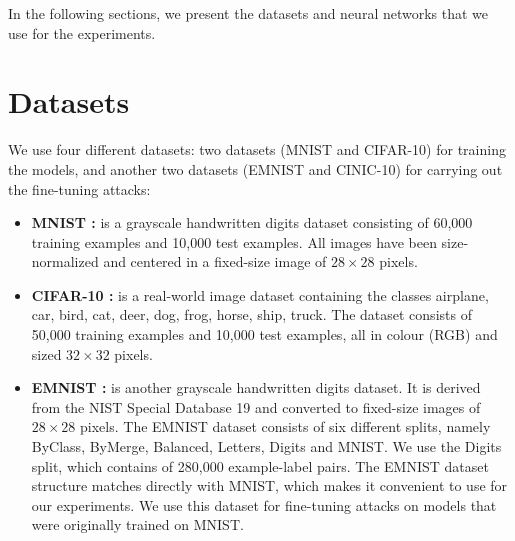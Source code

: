 
In the following sections, we present the datasets and neural networks that we use for the experiments.

\section{Datasets}
We use four different datasets: two datasets (MNIST and CIFAR-10) for training the models, and another two datasets (EMNIST and CINIC-10) for carrying out the fine-tuning attacks:
\begin{itemize}
    \item \textbf{MNIST \cite{lecun_gradient-based_1998}:} is a grayscale handwritten digits dataset consisting of 60,000 training examples and 10,000 test examples. All images have been size-normalized and centered in a fixed-size image of $28\times28$ pixels.
    \item \textbf{CIFAR-10 \cite{krizhevsky_learning_2009}:} is a real-world image dataset containing the classes airplane, car, bird, cat, deer, dog, frog, horse, ship, truck. The dataset consists of 50,000 training examples and 10,000 test examples, all in colour (RGB) and sized $32\times32$ pixels.
    \item \textbf{EMNIST \cite{cohen_emnist_2017}:} is another grayscale handwritten digits dataset. It is derived from the NIST Special Database 19 \cite{grother_NIST_1970} and converted to fixed-size images of $28\times28$ pixels. The EMNIST dataset consists of six different splits, namely ByClass, ByMerge, Balanced, Letters, Digits and MNIST. We use the Digits split, which contains of 280,000 example-label pairs. The EMNIST dataset structure matches directly with MNIST, which makes it convenient to use for our experiments. We use this dataset for fine-tuning attacks on models that were originally trained on MNIST.

\end{itemize}
